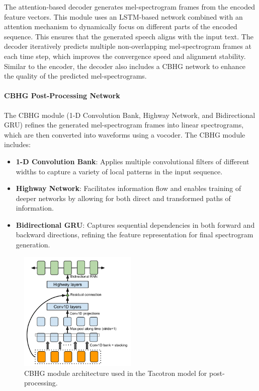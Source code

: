 The attention-based decoder generates mel-spectrogram frames from the encoded feature vectors. This module uses an LSTM-based network combined with an attention mechanism to dynamically focus on different parts of the encoded sequence. This ensures that the generated speech aligns with the input text. The decoder iteratively predicts multiple non-overlapping mel-spectrogram frames at each time step, which improves the convergence speed and alignment stability. Similar to the encoder, the decoder also includes a CBHG network to enhance the quality of the predicted mel-spectrograms.

\paragraph{CBHG Post-Processing Network}\mbox{}


The CBHG module (1-D Convolution Bank, Highway Network, and Bidirectional GRU) refines the generated mel-spectrogram frames into linear spectrograms, which are then converted into waveforms using a vocoder. The CBHG module includes:

\begin{itemize}
    \item \textbf{1-D Convolution Bank}: Applies multiple convolutional filters of different widths to capture a variety of local patterns in the input sequence.
    \item \textbf{Highway Network}: Facilitates information flow and enables training of deeper networks by allowing for both direct and transformed paths of information.
    \item \textbf{Bidirectional GRU}: Captures sequential dependencies in both forward and backward directions, refining the feature representation for final spectrogram generation.
\end{itemize}

\begin{figure}[h]
\centering
\includegraphics[width=0.5\textwidth]{cbhg.png}
\caption{CBHG module architecture used in the Tacotron model for post-processing.}
\label{fig:cbhg_module}
\end{figure}

